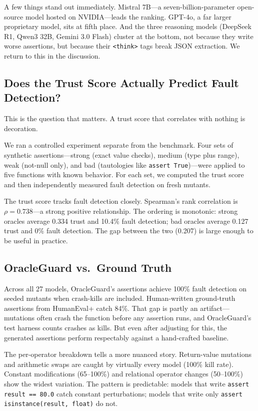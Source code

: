 \documentclass[conference]{IEEEtran}
\begin{document}
A few things stand out immediately. Mistral 7B---a seven-billion-parameter open-source model hosted on NVIDIA---leads the ranking. GPT-4o, a far larger proprietary model, sits at fifth place. And the three reasoning models (DeepSeek R1, Qwen3 32B, Gemini 3.0 Flash) cluster at the bottom, not because they write worse assertions, but because their \texttt{<think>} tags break JSON extraction. We return to this in the discussion.

\subsection{Does the Trust Score Actually Predict Fault Detection?}

This is the question that matters. A trust score that correlates with nothing is decoration.

We ran a controlled experiment separate from the benchmark. Four sets of synthetic assertions---strong (exact value checks), medium (type plus range), weak (not-null only), and bad (tautologies like \texttt{assert True})---were applied to five functions with known behavior. For each set, we computed the trust score and then independently measured fault detection on fresh mutants.

The trust score tracks fault detection closely. Spearman's rank correlation is $\rho = 0.738$---a strong positive relationship. The ordering is monotonic: strong oracles average 0.334 trust and 10.4\% fault detection; bad oracles average 0.127 trust and 0\% fault detection. The gap between the two (0.207) is large enough to be useful in practice.

\subsection{OracleGuard vs.\ Ground Truth}

Across all 27 models, OracleGuard's assertions achieve 100\% fault detection on seeded mutants when crash-kills are included. Human-written ground-truth assertions from HumanEval+ catch 84\%. That gap is partly an artifact---mutations often crash the function before any assertion runs, and OracleGuard's test harness counts crashes as kills. But even after adjusting for this, the generated assertions perform respectably against a hand-crafted baseline.

The per-operator breakdown tells a more nuanced story. Return-value mutations and arithmetic swaps are caught by virtually every model (100\% kill rate). Constant modifications (65--100\%) and relational operator changes (50--100\%) show the widest variation. The pattern is predictable: models that write \texttt{assert result == 80.0} catch constant perturbations; models that write only \texttt{assert isinstance(result, float)} do not.
\end{document}
